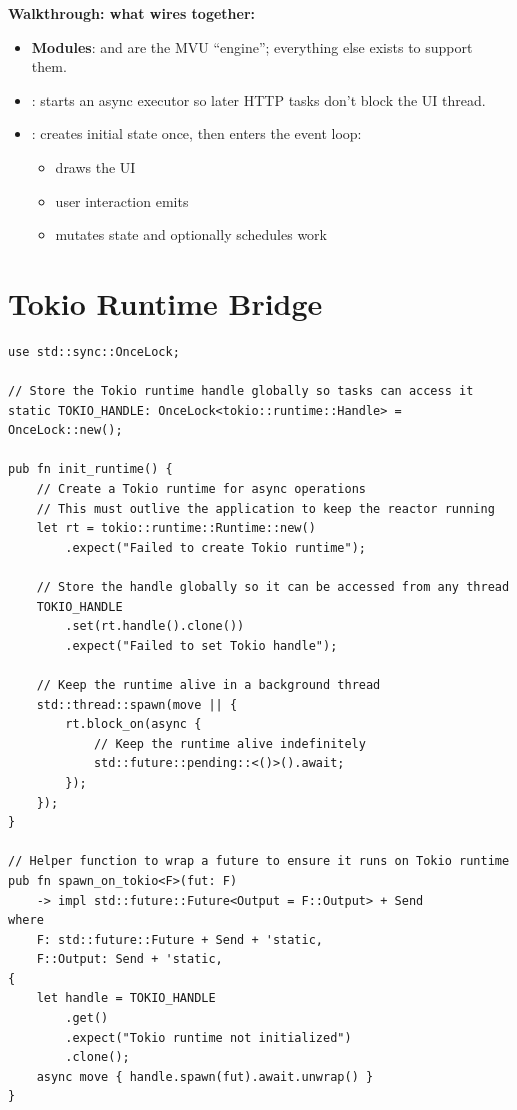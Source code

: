 \textbf{Walkthrough: what  wires together:}

\begin{itemize}
  \item \textbf{Modules}:  and  are the MVU ``engine''; everything else exists to support them.
  \item \textbf{}: starts an async executor so later HTTP tasks don't block the UI thread.
  \item \textbf{}: creates initial state once, then enters the event loop:
  \begin{itemize}
    \item {} draws the UI
    \item user interaction emits 
    \item {} mutates state and optionally schedules work
  \end{itemize}
\end{itemize}

\section{Tokio Runtime Bridge}
\label{sec:ch16-tokio-runtime}

\begin{listing}[H]
\caption{Tokio runtime bridge ()}
\label{lst:ch16-runtime}
\begin{verbatim}
use std::sync::OnceLock;

// Store the Tokio runtime handle globally so tasks can access it
static TOKIO_HANDLE: OnceLock<tokio::runtime::Handle> = OnceLock::new();

pub fn init_runtime() {
    // Create a Tokio runtime for async operations
    // This must outlive the application to keep the reactor running
    let rt = tokio::runtime::Runtime::new()
        .expect("Failed to create Tokio runtime");

    // Store the handle globally so it can be accessed from any thread
    TOKIO_HANDLE
        .set(rt.handle().clone())
        .expect("Failed to set Tokio handle");

    // Keep the runtime alive in a background thread
    std::thread::spawn(move || {
        rt.block_on(async {
            // Keep the runtime alive indefinitely
            std::future::pending::<()>().await;
        });
    });
}

// Helper function to wrap a future to ensure it runs on Tokio runtime
pub fn spawn_on_tokio<F>(fut: F)
    -> impl std::future::Future<Output = F::Output> + Send
where
    F: std::future::Future + Send + 'static,
    F::Output: Send + 'static,
{
    let handle = TOKIO_HANDLE
        .get()
        .expect("Tokio runtime not initialized")
        .clone();
    async move { handle.spawn(fut).await.unwrap() }
}
\end{verbatim}
\end{listing}

